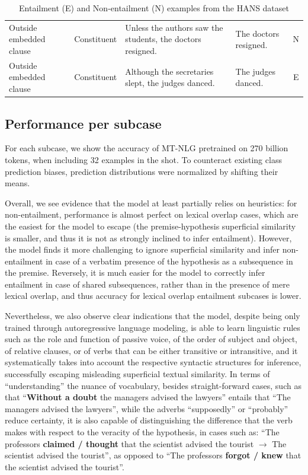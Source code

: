 \documentclass[11pt]{article}
\begin{document}
\begin{table}[]
\begin{adjustbox}{width=1.1\textwidth}
\begin{tabular}{@{}lcllc@{}}
Outside embedded clause              & Constituent        & Unless the authors saw the students, the doctors resigned. & The doctors resigned.                   & N              \\
Outside embedded clause              & Constituent        & Although the secretaries slept, the judges danced.         & The judges danced.                      & E             \\
\bottomrule
\end{tabular}
\end{adjustbox}
\caption{Entailment (E) and Non-entailment (N) examples from the HANS dataset}
\label{tab:hans_examples}
\end{table}


\subsection{Performance per subcase}

For each subcase, we show the accuracy of MT-NLG pretrained on 270 billion tokens, when including 32 examples in the shot. To counteract existing class prediction biases, prediction distributions were normalized by shifting their means.

Overall, we see evidence that the model at least partially relies on heuristics: for non-entailment, performance is almost perfect on lexical overlap cases, which are the easiest for the model to escape (the premise-hypothesis superficial similarity is smaller, and thus it is not as strongly inclined to infer entailment). However, the model finds it more challenging to ignore superficial similarity and infer non-entailment in case of a verbatim presence of the hypothesis as a subsequence in the premise. Reversely, it is much easier for the model to correctly infer entailment in case of shared subsequences, rather than in the presence of mere lexical overlap, and thus accuracy for lexical overlap entailment subcases is lower.

Nevertheless, we also observe clear indications that the model, despite being only trained through autoregressive language modeling, is able to learn linguistic rules such as the role and function of passive voice, of the order of subject and object, of relative clauses, or of verbs that can be either transitive or intransitive, and it systematically takes into account the respective syntactic structures for inference, successfully escaping misleading superficial textual similarity. In terms of ``understanding'' the nuance of vocabulary, besides straight-forward cases, such as that ``\textbf{Without a doubt} the managers advised the lawyers'' entails that ``The managers advised the lawyers'', while the adverbs ``supposedly'' or ``probably'' reduce certainty, it is also capable of distinguishing the difference that the verb makes with respect to the veracity of the hypothesis, in cases such as: ``The professors \textbf{claimed / thought} that the scientist advised the tourist $\rightarrow$ The scientist advised the tourist'', as opposed to ``The professors \textbf{forgot / knew} that the scientist advised the tourist''.
\end{document}
